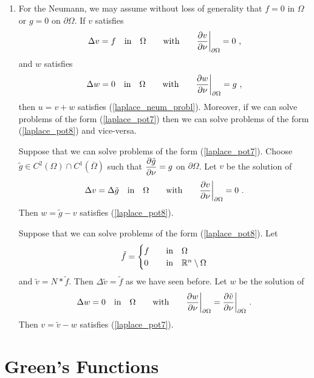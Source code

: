 \begin{enumerate}
\item For the Neumann, we may assume without loss of generality that
$f=0$ in $\Omega$ or $g=0$ on $\partial \Omega$.
If $v$ satisfies
\begin{equation} \label{laplace_pot7}
\Delta v = f \quad \text{in} \quad \Omega \qquad \text{with}
\qquad \frac{\partial{v}}{\partial \mathbf{\nu}}\bigg|_{\partial \Omega} = 0 \ ,
\end{equation}
and $w$ satisfies
\begin{equation} \label{laplace_pot8}
\Delta w = 0 \quad \text{in} \quad \Omega \qquad \text{with}
\qquad \frac{\partial{w}}{\partial \mathbf{\nu}}\bigg|_{\partial \Omega} = g \ ,
\end{equation}
then $u=v+w$ satisfies (\ref{laplace_neum_probl}).  Moreover, if we
can solve problems of the form (\ref{laplace_pot7}) then we can solve
problems of the form (\ref{laplace_pot8}) and vice-versa.

Suppose that we can solve problems of the form (\ref{laplace_pot7}).
Choose
$\displaystyle \tilde{g} \in C^2(\Omega) \cap C^1(\overline{\Omega})$ such that
$\displaystyle \frac{\partial{\tilde{g}}}{\partial \mathbf{\nu}} = g$ on $\partial \Omega$.
Let $v$ be the solution of
\[
\Delta v = \Delta \tilde{g} \quad \text{in} \quad \Omega \qquad \text{with}
\qquad \frac{\partial{v}}{\partial \mathbf{\nu}}\bigg|_{\partial \Omega} = 0 \ .
\]
Then $w=\tilde{g}-v$ satisfies (\ref{laplace_pot8}).

Suppose that we can solve problems of the form (\ref{laplace_pot8}).
Let
\[
\tilde{f} =
\begin{cases}
f & \quad \text{in} \quad \Omega \\
0 & \quad \text{in} \quad \mathbb{R}^n\setminus \Omega
\end{cases}
\]
and $\tilde{v} = N\ast \tilde{f}$.  Then
$\displaystyle \Delta \tilde{v} = \tilde{f}$ as we have seen before.
Let $w$ be the solution of
\[
\Delta w = 0 \quad \text{in} \quad \Omega \qquad \text{with}
\qquad \frac{\partial{w}}{\partial \mathbf{\nu}}\bigg|_{\partial \Omega} =
\frac{\partial{\tilde{v}}}{\partial \mathbf{\nu}}\bigg|_{\partial \Omega} \ .
\]
Then $v=\tilde{v}-w$ satisfies (\ref{laplace_pot7}).
\end{enumerate}

\section{Green's Functions}

